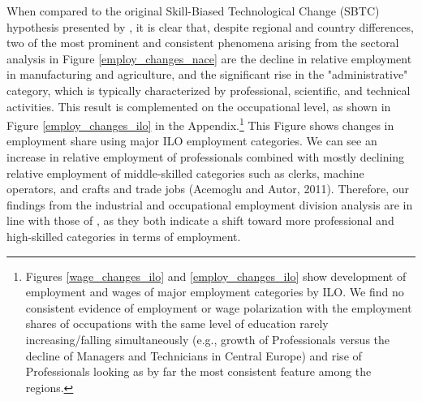 \documentclass[11pt]{article}
\begin{document}


When compared to the original Skill-Biased Technological Change (SBTC) hypothesis presented by \cite{katz1992changes}, it is clear that, despite regional and country differences, two of the most prominent and consistent phenomena arising from the sectoral analysis in Figure \ref{employ_changes_nace} are the decline in relative employment in manufacturing and agriculture, and the significant rise in the "administrative" category, which is typically characterized by professional, scientific, and technical activities. This result is complemented on the occupational level, as shown in Figure \ref{employ_changes_ilo} in the Appendix.\footnote{Figures \ref{wage_changes_ilo} and \ref{employ_changes_ilo} show development of employment and wages of major employment categories by ILO. We find no consistent evidence of employment or wage polarization with the employment shares of occupations with the same level of education rarely increasing/falling simultaneously (e.g., growth of Professionals versus the decline of Managers and Technicians in Central Europe) and rise of Professionals looking as by far the most consistent feature among the regions.} This Figure shows changes in employment share using major ILO employment categories. We can see an increase in relative employment of professionals combined with mostly declining relative employment of middle-skilled categories such as clerks, machine operators, and crafts and trade jobs (Acemoglu and Autor, 2011). Therefore, our findings from the industrial and occupational employment division analysis are in line with those of \cite{katz1992changes}, as they both indicate a shift toward more professional and high-skilled categories in terms of employment.
\end{document}

